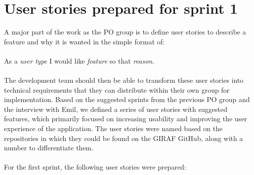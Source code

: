 \section{User stories prepared for sprint 1}\label{pre-sprint-1-user-stories}
A major part of the work as the PO group is to define user stories to describe a feature and why it is wanted in the simple format of:
\\\\
As a \textit{user type} I would like \textit{feature} so that \textit{reason}.
\\\\
The development team should then be able to transform these user stories into technical requirements that they can distribute within their own group for implementation.
Based on the suggested sprints from the previous PO group and the interview with Emil, we defined a series of user stories with suggested features, which primarily focused on increasing usability and improving the user experience of the application.
The user stories were named based on the repositories in which they could be found on the GIRAF GitHub, along with a number to differentiate them.
\\\\
For the first sprint, the following user stories were prepared:

